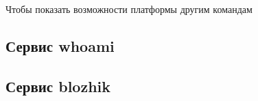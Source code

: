 Чтобы показать возможности платформы другим командам 

\subsection{Сервис whoami}


\subsection{Сервис blozhik}
